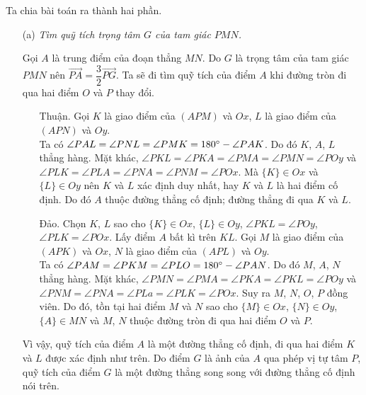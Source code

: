     \begin{solution}
        Ta chia bài toán ra thành hai phần.
        
        \begin{enumerate}
        
            \item[(a)] \textit{Tìm quỹ tích trọng tâm \(G\) của tam giác \(PMN\).}

            Gọi \(A\) là trung điểm của đoạn thẳng \(MN\). Do \(G\) là trọng tâm của tam giác \(PMN\) nên \(\overrightarrow{PA} = \dfrac{3}{2}\overrightarrow{PG}\). Ta sẽ đi tìm quỹ tích của điểm \(A\) khi đường tròn đi qua hai điểm \(O\) và \(P\) thay đổi.

            \begin{enumerate}[leftmargin=1.25cm]
            
                \item[Thuận.] Gọi \(K\) là giao điểm của \((APM)\) và \(Ox\), \(L\) là giao điểm của \((APN)\) và \(Oy\).\\
                Ta có \(\angle PAL = \angle PNL = \angle PMK = 180 \degree - \angle PAK\). Do đó \(K\), \(A\), \(L\) thẳng hàng. Mặt khác, \(\angle PKL = \angle PKA = \angle PMA = \angle PMN = \angle POy\) và \(\angle PLK = \angle PLA = \angle PNA = \angle PNM = \angle POx\). Mà \(\{K\} \in Ox\) và \(\{L\} \in Oy\) nên \(K\) và \(L\) xác định duy nhất, hay \(K\) và \(L\) là hai điểm cố định. Do đó \(A\) thuộc đường thẳng cố định; đường thẳng đi qua \(K\) và \(L\).

                \item[Đảo.] Chọn \(K\), \(L\) sao cho \(\{K\} \in Ox\), \(\{L\} \in Oy\), \(\angle PKL = \angle POy\), \(\angle PLK = \angle POx\). Lấy điểm \(A\) bất kì trên \(KL\). Gọi \(M\) là giao điểm của \((APK)\) và \(Ox\), \(N\) là giao điểm của \((APL)\) và \(Oy\).\\
                Ta có \(\angle PAM = \angle PKM = \angle PLO = 180 \degree - \angle PAN\). Do đó \(M\), \(A\), \(N\) thẳng hàng. Mặt khác, \(\angle PMN = \angle PMA = \angle PKA = \angle PKL = \angle POy\) và \(\angle PNM = \angle PNA = \angle PLa = \angle PLK = \angle POx\). Suy ra \(M\), \(N\), \(O\), \(P\) đồng viên. Do đó, tồn tại hai điểm \(M\) và \(N\) sao cho \(\{M\} \in Ox\), \(\{N\} \in Oy\), \(\{A\} \in MN\) và \(M\), \(N\) thuộc đường tròn đi qua hai điểm \(O\) và \(P\).
            
            \end{enumerate}

            Vì vậy, quỹ tích của điểm \(A\) là một đường thẳng cố định, đi qua hai điểm \(K\) và \(L\) được xác định như trên. Do điểm \(G\) là ảnh của \(A\) qua phép vị tự tâm \(P\), quỹ tích của điểm \(G\) là một đường thẳng song song với đường thẳng cố định nói trên.


\end{enumerate}
\end{solution}
